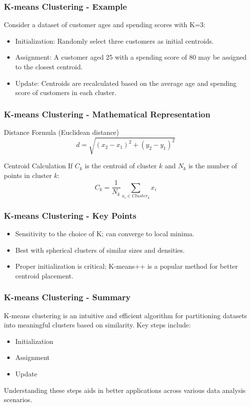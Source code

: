 \documentclass{beamer}
\begin{document}
\begin{frame}[fragile]
    \frametitle{K-means Clustering - Example}
    Consider a dataset of customer ages and spending scores with K=3:
    \begin{itemize}
        \item Initialization: Randomly select three customers as initial centroids.
        \item Assignment: A customer aged 25 with a spending score of 80 may be assigned to the closest centroid.
        \item Update: Centroids are recalculated based on the average age and spending score of customers in each cluster.
    \end{itemize}
\end{frame}

\begin{frame}[fragile]
    \frametitle{K-means Clustering - Mathematical Representation}
    \begin{block}{Distance Formula (Euclidean distance)}
        \begin{equation}
            d = \sqrt{(x_2 - x_1)^2 + (y_2 - y_1)^2}
        \end{equation}
    \end{block}

    \begin{block}{Centroid Calculation}
        If \( C_k \) is the centroid of cluster \( k \) and \( N_k \) is the number of points in cluster \( k \):
        \begin{equation}
            C_k = \frac{1}{N_k} \sum_{x_i \in Cluster_k} x_i
        \end{equation}
    \end{block}
\end{frame}

\begin{frame}[fragile]
    \frametitle{K-means Clustering - Key Points}
    \begin{itemize}
        \item Sensitivity to the choice of K; can converge to local minima.
        \item Best with spherical clusters of similar sizes and densities.
        \item Proper initialization is critical; K-means++ is a popular method for better centroid placement.
    \end{itemize}
\end{frame}

\begin{frame}[fragile]
    \frametitle{K-means Clustering - Summary}
    K-means clustering is an intuitive and efficient algorithm for partitioning datasets into meaningful clusters based on similarity. 
    Key steps include:
    \begin{itemize}
        \item Initialization
        \item Assignment
        \item Update
    \end{itemize}
    Understanding these steps aids in better applications across various data analysis scenarios.
\end{frame}
\end{document}
